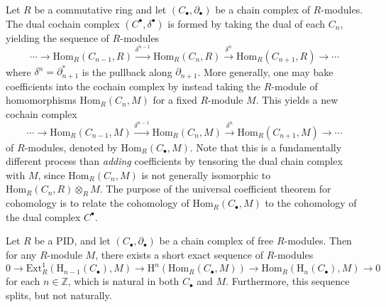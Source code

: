 Let $R$ be a commutative ring and let $(C_\bullet, \partial_\bullet)$ be a chain complex of $R$-modules. The dual cochain complex $(C^\bullet, \delta^\bullet)$ is formed by taking the dual of each $C_n$, yielding the sequence of $R$-modules
\begin{equation*}
    \cdots \to \mathrm{Hom}_R(C_{n-1}, R) \xrightarrow{\delta^{n-1}} \mathrm{Hom}_R(C_n, R) \xrightarrow{\delta^n} \mathrm{Hom}_R(C_{n+1}, R) \to \cdots
\end{equation*}
where $\delta^n = \partial_{n+1}^*$ is the pullback along $\partial_{n+1}$. More generally, one may bake coefficients into the cochain complex by instead taking the $R$-module of homomorphisms $\mathrm{Hom}_R(C_n, M)$ for a fixed $R$-module $M$. This yields a new cochain complex
\begin{equation*}
    \cdots \to \mathrm{Hom}_R(C_{n-1}, M) \xrightarrow{\delta^{n-1}} \mathrm{Hom}_R(C_n, M) \xrightarrow{\delta^n} \mathrm{Hom}_R(C_{n+1}, M) \to \cdots
\end{equation*}
of $R$-modules, denoted by $\mathrm{Hom}_R(C_\bullet, M)$. Note that this is a fundamentally different process than \emph{adding} coefficients by tensoring the dual chain complex with $M$, since $\mathrm{Hom}_R(C_n, M)$ is not generally isomorphic to $\mathrm{Hom}_R(C_n, R) \otimes_R M$. The purpose of the universal coefficient theorem for cohomology is to relate the cohomology of $\mathrm{Hom}_R(C_\bullet, M)$ to the cohomology of the dual complex $C^\bullet$.

\begin{theorem}
    Let $R$ be a PID, and let $(C_\bullet, \partial_\bullet)$ be a chain complex of free $R$-modules. Then for any $R$-module $M$, there exists a short exact sequence of $R$-modules 
    \begin{equation*}
        0 \to \mathrm{Ext}_R^1(\mathrm{H}_{n-1}(C_\bullet), M) \to \mathrm{H}^n(\mathrm{Hom}_R(C_\bullet, M)) \to \mathrm{Hom}_R(\mathrm{H}_n(C_\bullet), M) \to 0
    \end{equation*}
    for each $n \in \mathbb{Z}$, which is natural in both $C_\bullet$ and $M$. Furthermore, this sequence splits, but not naturally.
\end{theorem}